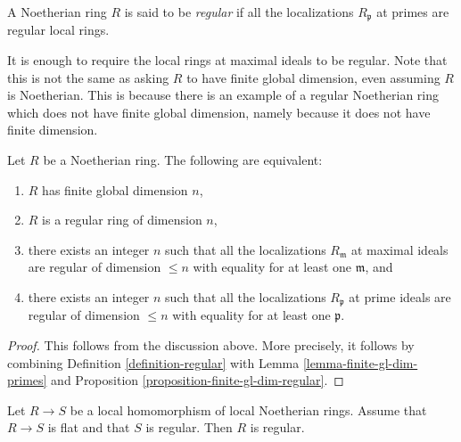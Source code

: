 \begin{definition}
\label{definition-regular}
A Noetherian ring $R$ is said to be {\it regular}
if all the localizations $R_{\mathfrak p}$ at primes are
regular local rings.
\end{definition}

\noindent
It is enough to require the local rings at maximal ideals to be regular.
Note that this is not the same as asking $R$ to have finite
global dimension, even assuming $R$ is Noetherian. This is
because there is an example of a regular Noetherian ring
which does not have finite global dimension, namely because
it does not have finite dimension.

\begin{lemma}
\label{lemma-finite-gl-dim-finite-dim-regular}
Let $R$ be a Noetherian ring.
The following are equivalent:
\begin{enumerate}
\item $R$ has finite global dimension $n$,
\item $R$ is a regular ring of dimension $n$,
\item there exists an integer $n$ such that
all the localizations $R_{\mathfrak m}$ at maximal ideals
are regular of dimension $\leq n$ with equality for at least
one $\mathfrak m$, and
\item there exists an integer $n$ such that
all the localizations $R_{\mathfrak p}$ at prime ideals
are regular of dimension $\leq n$ with equality for at least
one $\mathfrak p$.
\end{enumerate}
\end{lemma}

\begin{proof}
This follows from the discussion above. More precisely, it follows
by combining Definition \ref{definition-regular} with
Lemma \ref{lemma-finite-gl-dim-primes}
and Proposition \ref{proposition-finite-gl-dim-regular}.
\end{proof}

\begin{lemma}
\label{lemma-flat-under-regular}
Let $R \to S$ be a local homomorphism of local Noetherian rings.
Assume that $R \to S$ is flat and that $S$ is regular.
Then $R$ is regular.
\end{lemma}

